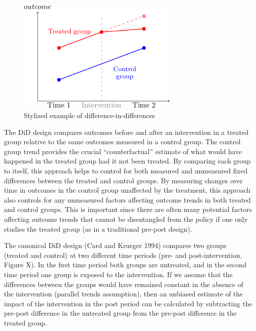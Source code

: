 \documentclass[
  letterpaper,
  DIV=11,
  numbers=noendperiod]{scrartcl}
\begin{document}
\begin{figure}

{\centering \includegraphics[width=0.7\textwidth,height=\textheight]{hei-report_files/figure-pdf/unnamed-chunk-1-1.pdf}

}

\caption{Stylized example of difference-in-differences}

\end{figure}

The DiD design compares outcomes before and after an intervention in a
treated group relative to the same outcomes measured in a control group.
The control group trend provides the crucial ``counterfactual'' estimate
of what would have happened in the treated group had it not been
treated. By comparing each group to itself, this approach helps to
control for both measured and unmeasured fixed differences between the
treated and control groups. By measuring changes over time in outcomes
in the control group unaffected by the treatment, this approach also
controls for any unmeasured factors affecting outcome trends in both
treated and control groups. This is important since there are often many
potential factors affecting outcome trends that cannot be disentangled
from the policy if one only studies the treated group (as in a
traditional pre-post design).

The canonical DiD design (Card and Krueger 1994) compares two groups
(treated and control) at two different time periods (pre- and
post-intervention, Figure X). In the first time period both groups are
untreated, and in the second time period one group is exposed to the
intervention. If we assume that the differences between the groups would
have remained constant in the absence of the intervention (parallel
trends assumption), then an unbiased estimate of the impact of the
intervention in the post period can be calculated by subtracting the
pre-post difference in the untreated group from the pre-post difference
in the treated group.
\end{document}
